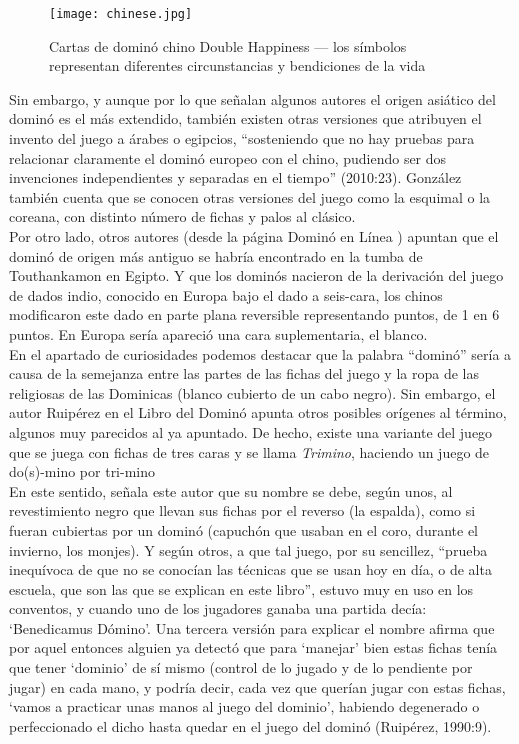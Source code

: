 \begin{figure}[h]
  \begin{center}
    \texttt{[image: chinese.jpg]}
  \end{center}
  \caption{Cartas de dominó chino Double Happiness --- los símbolos representan diferentes
            circunstancias y bendiciones de la vida }
  \label{}
\end{figure}

Sin embargo, y aunque por lo que señalan algunos autores el origen asiático del dominó es el más
extendido, también existen otras versiones que atribuyen el invento del juego a árabes o egipcios,
“sosteniendo que no hay pruebas para relacionar claramente el dominó europeo con el chino, pudiendo
ser dos invenciones independientes y separadas en el tiempo” (2010:23). González también cuenta que
se conocen otras versiones del juego como la esquimal o la coreana, con distinto número de fichas
y palos al clásico. \\

Por otro lado, otros autores (desde la página Dominó en Línea \cite{website:dominoenlinea}) apuntan que el dominó
de origen más antiguo se habría encontrado en la tumba de Touthankamon en Egipto. Y que los dominós nacieron de la derivación del juego de dados indio, conocido en Europa bajo el dado a seis-cara, los chinos modificaron este dado en parte plana reversible representando puntos, de 1 en 6 puntos. En Europa sería apareció una cara suplementaria, el blanco. \\

En el apartado de curiosidades podemos destacar que la palabra “dominó”
sería a causa de la semejanza entre las partes de las fichas del juego y la ropa de las religiosas
de las Dominicas (blanco cubierto de un cabo negro). Sin embargo, el autor Ruipérez en el Libro
del Dominó apunta otros posibles orígenes al término, algunos muy parecidos al ya apuntado. De hecho, existe una variante del juego que se juega con fichas de tres caras y se llama \emph{Trimino}, haciendo un juego de do(s)-mino por tri-mino \cite{website:trimino}\\

En este sentido, señala este autor que su nombre se debe, según unos, al revestimiento negro que
llevan sus fichas por el reverso (la espalda), como si fueran cubiertas por un dominó (capuchón
que usaban en el coro, durante el invierno, los monjes). Y según otros, a que tal juego, por su
sencillez, “prueba inequívoca de que no se conocían las técnicas que se usan hoy en día, o de alta
escuela, que son las que se explican en este libro”, estuvo muy en uso en los conventos, y cuando
uno de los jugadores ganaba una partida decía: ‘Benedicamus Dómino’. Una tercera versión para
explicar el nombre afirma que por aquel entonces alguien ya detectó que para ‘manejar’ bien estas
fichas tenía que tener ‘dominio’ de sí mismo (control de lo jugado y de lo pendiente por jugar) en
cada mano, y podría decir, cada vez que querían jugar con estas fichas, ‘vamos a practicar unas
manos al juego del dominio’, habiendo degenerado o perfeccionado el dicho hasta quedar en el juego
del dominó (Ruipérez, 1990:9). \\

